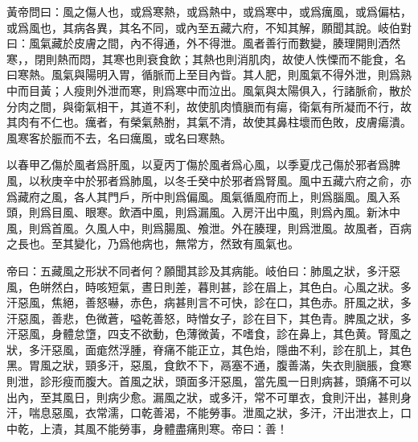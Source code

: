 \documentclass[draft,12pt]{ctexbook}
\begin{document}
\begin{yuanwen}
黃帝問曰：風之傷人也，或爲寒熱，或爲熱中，或爲寒中，或爲癘風，或爲偏枯，或爲風也，其病各異，其名不同，或內至五藏六府，不知其解，願聞其說。岐伯對曰：風氣藏於皮膚之間，內不得通，外不得泄。風者善行而數變，腠理開則洒然寒，，閉則熱而悶，其寒也則衰食飲；其熱也則消肌肉，故使人怢慄而不能食，名曰寒熱。風氣與陽明入胃，循脈而上至目內眥。其人肥，則風氣不得外泄，則爲熟中而目黃；人瘦則外泄而寒，則爲寒中而泣出。風氣與太陽俱入，行諸脈俞，散於分肉之間，與衛氣相干，其道不利，故使肌肉憤䐜而有瘍，衛氣有所凝而不行，故其肉有不仁也。癘者，有榮氣熱胕，其氣不清，故使其鼻柱壞而色敗，皮膚瘍潰。風寒客於脤而不去，名曰癘風，或名曰寒熱。

以春甲乙傷於風者爲肝風，以夏丙丁傷於風者爲心風，以季夏戊己傷於邪者爲脾風，以秋庚辛中於邪者爲肺風，以冬壬癸中於邪者爲腎風。風中五藏六府之俞，亦爲藏府之風，各人其門戶，所中則爲偏風。風氣循風府而上，則爲腦風。風入系頭，則爲目風、眼寒。飲酒中風，則爲漏風。入房汗出中風，則爲內風。新沐中風，則爲首風。久風人中，則爲腸風、飧泄。外在腠理，則爲泄風。故風者，百病之長也。至其變化，乃爲他病也，無常方，然致有風氣也。

帝曰：五藏風之形狀不同者何？願聞其診及其病能。岐伯曰：肺風之狀，多汗惡風，色皏然白，時咳短氣，晝日則差，暮則甚，診在眉上，其色白。心風之狀。多汗惡風，焦絕，善怒嚇，赤色，病甚則言不可快，診在口，其色赤。肝風之狀，多汗惡風，善悲，色微蒼，嗌乾善怒，時憎女子，診在目下，其色青。脾風之狀，多汗惡風，身體怠墯，四支不欲動，色薄微黃，不嗜食，診在鼻上，其色黄。腎風之狀，多汗惡風，面痝然浮腫，脊痛不能正立，其色炲，隱曲不利，診在肌上，其色黑。胃風之狀，頸多汗，惡風，食飲不下，鬲塞不通，腹善滿，失衣則䐜脹，食寒則泄，診形瘦而腹大。首風之狀，頭面多汗惡風，當先風一日則病甚，頭痛不可以出內，至其風日，則病少愈。漏風之狀，或多汗，常不可單衣，食則汗出，甚則身汗，喘息惡風，衣常濡，口乾善渴，不能勞事。泄風之狀，多汗，汗出泄衣上，口中乾，上漬，其風不能勞事，身體盡痛則寒。帝曰：善！
\end{yuanwen}

\end{document}
